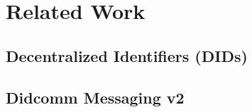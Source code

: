 \chapter{Related Work}
\label{cha:relatedwork}

\section{Decentralized Identifiers (DIDs)}
\section{Didcomm Messaging v2}

